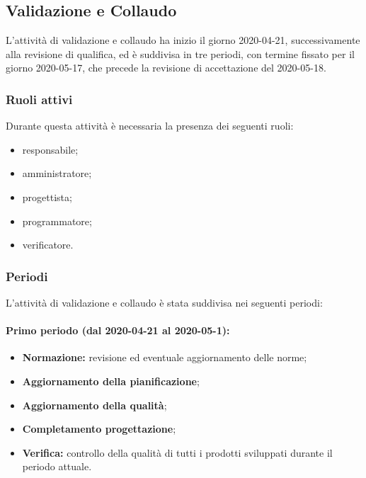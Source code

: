		\subsection{Validazione e Collaudo}	
		
			L'attività di validazione e collaudo ha inizio il giorno 2020-04-21, successivamente alla revisione di qualifica, ed è suddivisa in tre periodi, con termine fissato per il giorno 2020-05-17, che precede la revisione di accettazione del 2020-05-18.
			
			\subsubsection{Ruoli attivi}
			
			Durante questa attività è necessaria la presenza dei seguenti ruoli:
			\begin{itemize}
				\item responsabile;
				\item amministratore;
				\item progettista;
				\item programmatore;
				\item verificatore.
			\end{itemize}
			
			\subsubsection{Periodi}
			
				L'attività di validazione e collaudo è stata suddivisa nei seguenti periodi:
		
				\paragraph{Primo periodo (dal 2020-04-21 al 2020-05-1):}
			
					\begin{itemize}
						\item \textbf{Normazione:} revisione ed eventuale aggiornamento delle norme;
						\item \textbf{Aggiornamento della pianificazione};
						\item \textbf{Aggiornamento della qualità};
						\item \textbf{Completamento progettazione};
						\item \textbf{Verifica:} controllo della qualità di tutti i prodotti sviluppati durante il periodo attuale.
					\end{itemize} 	
				
